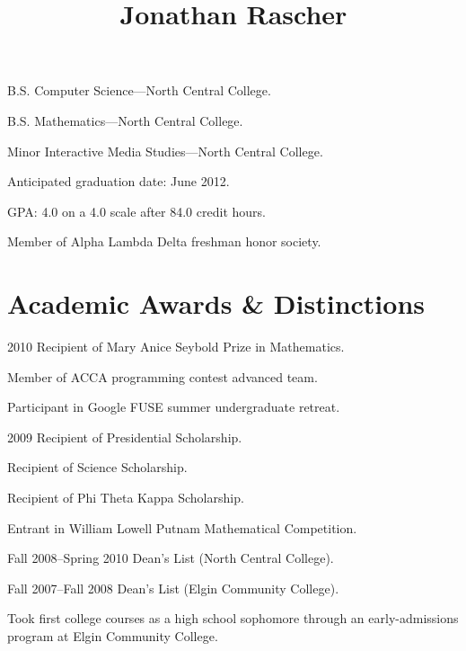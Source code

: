 \documentclass{simplecv}
\begin{document}
  \leftheader{
    \contactemail \\
    \contactphone
  }

  \rightheader{
    \contactaddressone \\
    \contactaddresstwo
  }

  \title{Jonathan Rascher}
  \maketitle

  \begin{topic}
    \item[B.S.] Computer Science---North Central College.

    \item[B.S.] Mathematics---North Central College.

    \item[Minor] Interactive Media Studies---North Central College.

    \item Anticipated graduation date: June 2012.

    \item GPA: 4.0 on a 4.0 scale after 84.0 credit hours.

    \item Member of Alpha Lambda Delta freshman honor society.
  \end{topic}

  \section{Academic Awards \& Distinctions}
  \begin{topic}
    \item[2010] Recipient of Mary Anice Seybold Prize in Mathematics.

    Member of ACCA programming contest advanced team.

    Participant in Google FUSE summer undergraduate retreat.

    \item[2009] Recipient of Presidential Scholarship.

    Recipient of Science Scholarship.

    Recipient of Phi Theta Kappa Scholarship.

    Entrant in William Lowell Putnam Mathematical Competition.

    \item[Fall 2008--Spring 2010] Dean's List (North Central College).

    \item[Fall 2007--Fall 2008] Dean's List (Elgin Community College).

    \item Took first college courses as a high school sophomore through an early-admissions program at Elgin Community College.
  \end{topic}
\end{document}
